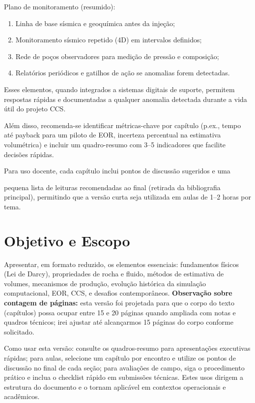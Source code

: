\documentclass[
  12pt,
  a4paper,
  oneside,
  brazilian,
  sumario=tradicional
]{abntex2}
\begin{document}
Plano de monitoramento (resumido):
\begin{enumerate}
  \item Linha de base sísmica e geoquímica antes da injeção;
  \item Monitoramento sísmico repetido (4D) em intervalos definidos;
  \item Rede de poços observadores para medição de pressão e composição;
  \item Relatórios periódicos e gatilhos de ação se anomalias forem detectadas.
\end{enumerate}

Esses elementos, quando integrados a sistemas digitais de suporte, permitem
respostas rápidas e documentadas a qualquer anomalia detectada durante a vida
útil do projeto CCS.

Além disso, recomenda-se identificar métricas-chave por capítulo (p.ex., tempo
até payback para um piloto de EOR, incerteza percentual na estimativa volumétrica)
e incluir um quadro-resumo com 3--5 indicadores que facilite decisões rápidas.

Para uso docente, cada capítulo inclui pontos de discussão sugeridos e uma

pequena lista de leituras recomendadas ao final (retirada da bibliografia
principal), permitindo que a versão curta seja utilizada em aulas de 1--2
horas por tema.

\section{Objetivo e Escopo}
Apresentar, em formato reduzido, os elementos essenciais: fundamentos físicos
(Lei de Darcy), propriedades de rocha e fluido, métodos de estimativa de
volumes, mecanismos de produção, evolução histórica da simulação computacional,
EOR, CCS, e desafios contemporâneos.
\vspace{6pt}
\noindent\textbf{Observação sobre contagem de páginas:} esta versão foi projetada
para que o corpo do texto (capítulos) possa ocupar entre 15 e 20 páginas quando
ampliada com notas e quadros técnicos; irei ajustar até alcançarmos 15 páginas
do corpo conforme solicitado.

Como usar esta versão: consulte os quadros-resumo para apresentações executivas
rápidas; para aulas, selecione um capítulo por encontro e utilize os pontos de
discussão no final de cada seção; para avaliações de campo, siga o procedimento
prático e inclua o checklist rápido em submissões técnicas. Estes usos dirigem a
estrutura do documento e o tornam aplicável em contextos operacionais e
acadêmicos.
\end{document}
